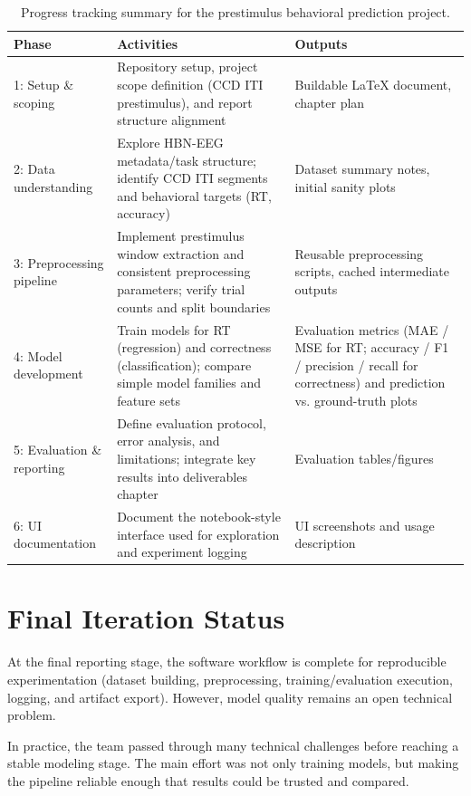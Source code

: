\begin{table}[H]
\centering
\begin{tabularx}{\textwidth}{|l|X|X|}
\hline
\textbf{Phase} & \textbf{Activities} & \textbf{Outputs} \\
\hline
1: Setup \& scoping & Repository setup, project scope definition (CCD ITI prestimulus), and report structure alignment & Buildable \LaTeX{} document, chapter plan \\
\hline
2: Data understanding & Explore HBN-EEG metadata/task structure; identify CCD ITI segments and behavioral targets (RT, accuracy) & Dataset summary notes, initial sanity plots \\
\hline
3: Preprocessing pipeline & Implement prestimulus window extraction and consistent preprocessing parameters; verify trial counts and split boundaries & Reusable preprocessing scripts, cached intermediate outputs \\
\hline
4: Model development & Train models for RT (regression) and correctness (classification); compare simple model families and feature sets & Evaluation metrics (MAE / MSE for RT; accuracy / F1 / precision / recall for correctness) and prediction vs.
ground-truth plots \\
\hline
5: Evaluation \& reporting & Define evaluation protocol, error analysis, and limitations; integrate key results into deliverables chapter & Evaluation tables/figures \\
\hline
6: UI documentation & Document the notebook-style interface used for exploration and experiment logging & UI screenshots and usage description \\
\hline
\end{tabularx}
\caption{Progress tracking summary for the prestimulus behavioral prediction project.}
\label{tab:progress-tracking}
\end{table}

\section{Final Iteration Status}
\label{sec:final-iteration-status}

At the final reporting stage, the software workflow is complete for reproducible experimentation (dataset building, preprocessing, training/evaluation execution, logging, and artifact export). However, model quality remains an open technical problem.

In practice, the team passed through many technical challenges before reaching a stable modeling stage. The main effort was not only training models, but making the pipeline reliable enough that results could be trusted and compared.

